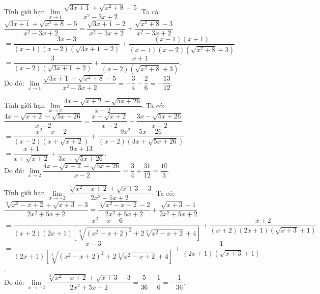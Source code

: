 \begin{bt}%
Tính giới hạn $\lim\limits_{x \to 1}\dfrac{\sqrt{3x+1} + \sqrt{x^2+8} - 5}{x^2 - 3x + 2}$.
\loigiai
{
Ta có:\\
$\dfrac{\sqrt{3x+1} + \sqrt{x^2+8} - 5}{x^2 - 3x + 2} = \dfrac{\sqrt{3x+1}-2}{x^2-3x+2} + \dfrac{\sqrt{x^2+8}-3}{x^2-3x+2}$\\
$= \dfrac{3x-3}{(x-1)(x-2)\left(\sqrt{3x+1}+2\right)} + \dfrac{(x-1)(x+1)}{(x-1)(x-2)\left(\sqrt{x^2+8}+3\right)}$\\
$= \dfrac{3}{(x-2)\left(\sqrt{3x+1}+2\right)} + \dfrac{x+1}{(x-2)\left(\sqrt{x^2+8}+3\right)}$.\\
Do đó: $\lim\limits_{x \to 1}\dfrac{\sqrt{3x+1} + \sqrt{x^2+8} - 5}{x^2 - 3x + 2} = -\dfrac{3}{4} - \dfrac{2}{6} = -\dfrac{13}{12}$.
}
\end{bt}


\begin{bt}%
Tính giới hạn $\lim\limits_{x \to 2}\dfrac{4x - \sqrt{x+2} - \sqrt{5x+26}}{x - 2}$.
\loigiai
{
Ta có:\\
$\dfrac{4x - \sqrt{x+2} - \sqrt{5x+26}}{x - 2} = \dfrac{x - \sqrt{x+2}}{x-2} + \dfrac{3x - \sqrt{5x+26}}{x-2}$\\
$= \dfrac{x^2-x-2}{(x-2)\left(x+\sqrt{x+2}\right)} + \dfrac{9x^2-5x-26}{(x-2)\left(3x+\sqrt{5x+26}\right)}$\\
$= \dfrac{x+1}{x+\sqrt{x+2}} + \dfrac{9x+13}{3x+\sqrt{5x+26}}$.\\
Do đó: $\lim\limits_{x \to 2}\dfrac{4x - \sqrt{x+2} - \sqrt{5x+26}}{x - 2} = \dfrac{3}{4} + \dfrac{31}{12} = \dfrac{10}{3}$.
}
\end{bt}


\begin{bt}%
Tính giới hạn $\lim\limits_{x \to -2}\dfrac{\sqrt[3]{x^2 - x + 2} + \sqrt{x + 3} - 3}{2x^2 + 5x + 2}$.
\loigiai
{
Ta có:\\
$\dfrac{\sqrt[3]{x^2 - x + 2} + \sqrt{x + 3} - 3}{2x^2 + 5x + 2} = \dfrac{\sqrt[3]{x^2-x+2}-2}{2x^2+5x+2} + \dfrac{\sqrt{x+3}-1}{2x^2+5x+2}$\\
$= \dfrac{x^2-x-6}{(x+2)(2x+1)\left[\sqrt[3]{(x^2-x+2)^2} + 2\sqrt[3]{x^2-x+2} + 4\right]} + \dfrac{x+2}{(x+2)(2x+1)\left(\sqrt{x+3} + 1\right)}$\\
$= \dfrac{x-3}{(2x+1)\left[\sqrt[3]{(x^2-x+2)^2} + 2\sqrt[3]{x^2-x+2} + 4\right]} + \dfrac{1}{(2x+1)\left(\sqrt{x+3} + 1\right)}$.\\
Do đó: $\lim\limits_{x \to -2}\dfrac{\sqrt[3]{x^2 - x + 2} + \sqrt{x + 3} - 3}{2x^2 + 5x + 2} = \dfrac{5}{36} - \dfrac{1}{6} = -\dfrac{1}{36}$.
}
\end{bt}

